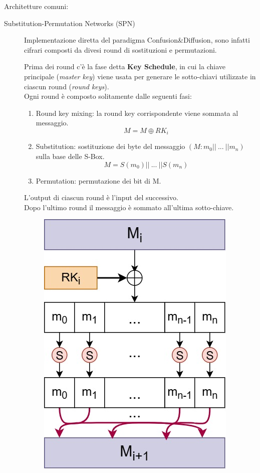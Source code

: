 \documentclass[target=bach,aauheader=,style=]{thud}
\begin{document}
            Architetture comuni:
            \begin{description}
                \item[Substitution-Permutation Networks (SPN)] Implementazione diretta del paradigma Confusion\&Diffusion\cite{moderncrypto}, sono infatti cifrari composti da divesi round di sostituzioni e permutazioni\cite{handcypto}.

                Prima dei round c'è la fase detta \textbf{Key Schedule}, in cui la chiave principale (\textit{master key}) viene usata per generare le sotto-chiavi utilizzate in ciascun round (\textit{round keys}).\\
                Ogni round è composto solitamente dalle seguenti fasi\cite{moderncrypto}:                
                \begin{enumerate}
                    \item Round key mixing: la round key corrispondente viene sommata al messaggio. \[M = M \oplus RK_i\]
                    \item Substitution: sostituzione dei byte del messaggio $(M:m_0||\ ...\ ||m_n)$ sulla base delle S-Box. \[M=S(m_0)||\ ...\ ||S(m_n)\]
                    \item Permutation: permutazione dei bit di M.
                \end{enumerate}
                L'output di ciascun round è l'input del successivo.\\
                Dopo l'ultimo round il messaggio è sommato all'ultima sotto-chiave.
                \begin{figure}[htbp]
                    \centering
                    \includegraphics[width=0.5\linewidth]{img/spn_round.jpg}

\end{figure}
\end{description}
\end{document}
